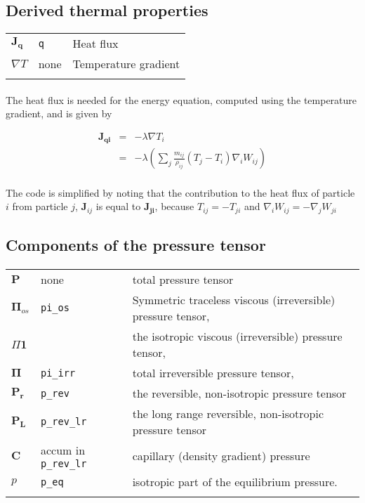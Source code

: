 \subsection{Derived thermal properties}
\begin{tabularx}{\textwidth}{lll} \toprule
$\mathbold{J_{q}}$ & \texttt{q} & Heat flux \\
$\nabla T$ & none & Temperature gradient \\
&&\\
\end{tabularx}

\paragraph{}
The heat flux is needed for the energy equation, computed using the temperature
gradient, and is given by

\begin{eqnarray}
\label{heat_flux_constitutive}
\mathbold{J_{qi}} &=& - \lambda \nabla T_{i} \\
& = & -\lambda \left( \sum_{j}  \frac{m_{ij}} {\rho_{ij}} \left(T_{j} 
- T_{i} \right) \nabla_{i}W_{ij} \right) \\
\end{eqnarray}

The code is simplified by noting that the contribution to the heat flux of
particle $i$ from particle $j$, $\mathbold{J}_{ij}$ is equal to
$\mathbold{J_{ji}}$, because $T_{ij} = - T_{ji}$ and 
$\nabla_{i}W_{ij} = -\nabla_{j}W_{ji}$

\subsection{Components of the pressure tensor}
\paragraph{}
\begin{tabularx}{\textwidth}{lll} \toprule
$\mathbold{P}$ & none & total pressure tensor \\
$\mathbold{\Pi}_{os}$   & \texttt{pi\_os} & Symmetric traceless viscous (irreversible) pressure tensor, \\
$\Pi \mathbold{1}$   & \texttt{} &  the isotropic viscous (irreversible) pressure tensor, \\
$\mathbold{\Pi}$   & \texttt{pi\_irr} &  total irreversible pressure tensor, \\
$\mathbold{P_{r}} $ & \texttt{p\_rev} & the reversible, non-isotropic pressure tensor  \\
$\mathbold{P_{L}}$  & \texttt{p\_rev\_lr} & the long range reversible, non-isotropic pressure tensor  \\
$\mathbold{C} $ & accum in \texttt{p\_rev\_lr} & capillary (density gradient) pressure \\
$p$ & \texttt{p\_eq} & isotropic part of the equilibrium pressure. \\
&&\\
\end{tabularx}


